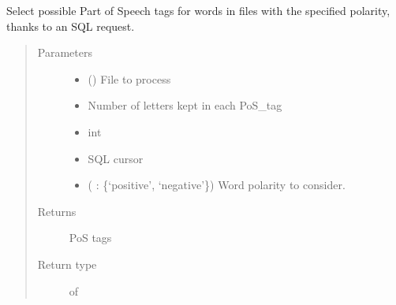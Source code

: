 \documentclass[letterpaper,10pt,english]{sphinxmanual}
\begin{document}
\begin{fulllineitems}
\label{\detokenize{analysis:loacore.analysis.frequencies.get_polarity_pos_tag_set}}
Select possible Part of Speech tags for words in files with the specified polarity, thanks to an SQL request.
\begin{quote}\begin{description}
\item[{Parameters}] \leavevmode\begin{itemize}
\item {} 
 () \textendash{} File to process

\item {} 
 \textendash{} Number of letters kept in each PoS\_tag

\item {} 
 \textendash{} int

\item {} 
 \textendash{} SQL cursor

\item {} 
 ( : \{‘positive’, ‘negative’\}) \textendash{} Word polarity to consider.

\end{itemize}

\item[{Returns}] \leavevmode
PoS tags

\item[{Return type}] \leavevmode
{} of 

\end{description}\end{quote}

\end{fulllineitems}

\end{document}
